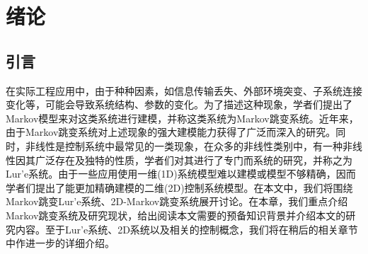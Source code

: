 
\chapter{绪论}
\section{引言}
	在实际工程应用中，由于种种因素，如信息传输丢失、外部环境突变、子系统连接变化等，可能会导致系统结构、参数的变化。为了描述这种现象，学者们提出了Markov模型来对这类系统进行建模，并称这类系统为Markov跳变系统。近年来，由于Markov跳变系统对上述现象的强大建模能力获得了广泛而深入的研究。同时，非线性是控制系统中最常见的一类现象，在众多的非线性类别中，有一种非线性因其广泛存在及独特的性质，学者们对其进行了专门而系统的研究，并称之为Lur'e系统。由于一些应用使用一维(1D)系统模型难以建模或模型不够精确，因而学者们提出了能更加精确建模的二维(2D)控制系统模型。在本文中，我们将围绕Markov跳变Lur'e系统、2D-Markov跳变系统展开讨论。在本章，我们重点介绍Markov跳变系统及研究现状，给出阅读本文需要的预备知识背景并介绍本文的研究内容。至于Lur'e系统、2D系统以及相关的控制概念，我们将在稍后的相关章节中作进一步的详细介绍。

